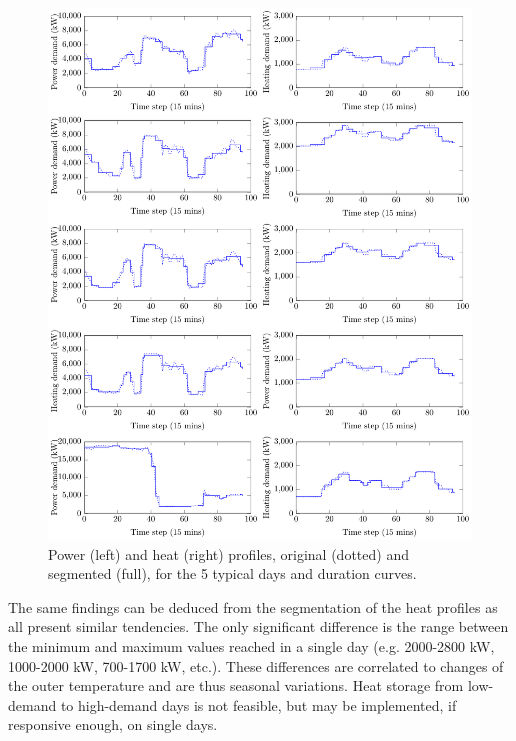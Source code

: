 \documentclass[preprint,12pt]{elsarticle}
\begin{document}
\begin{figure}[htbp!]
	\centering
 	\includegraphics[width=0.95\linewidth]{Figures/segmentation_new.pdf}
	\caption{Power (left) and heat (right) profiles, original (dotted) and segmented (full), for the 5 typical days and duration curves.}
	\label{fig:res:powerProfileSegmented}
\end{figure}
 
 

The same findings can be deduced from the segmentation of the heat profiles as all present similar tendencies. The only significant difference is the range between the minimum and maximum values reached in a single day (e.g. 2000-2800 kW, 1000-2000 kW, 700-1700 kW, etc.). These differences are correlated to changes of the outer temperature and are thus seasonal variations. Heat storage from low-demand to high-demand days is not feasible, but may be implemented, if responsive enough, on single days.   
\end{document}
